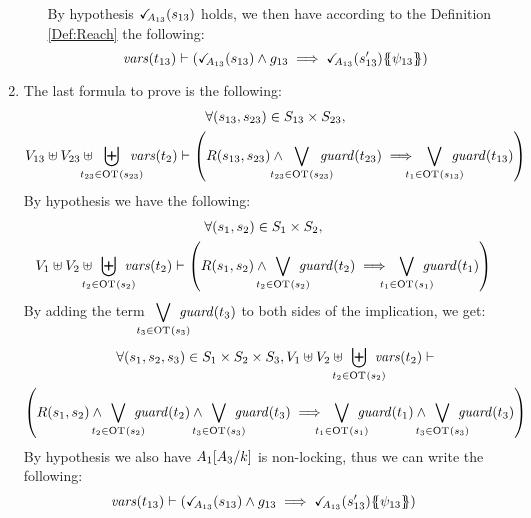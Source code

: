 \documentclass[runningheads]{llncs}
\begin{document}
\begin{enumerate}
\begin{itemize}
By hypothesis $\checkmark_{\!\! A_{13}}{\left(s_{13}\right)}$ holds,  we then have according to the Definition \ref{Def:Reach} the following:
\[ \fvars{t_{13}} \vdash \left(\reach{A_{13}}\mpar{s_{13}} \wedge g_{13} \implies \reach{A_{13}}\mpar{s_{13}'}\psubst{\psi_{13}}\right) \]	
\end{itemize}
\item The last formula to prove is the following:
\begin{multline*}
\forall \mpar{s_{13}, s_{23}} \in S_{13} \times S_{23},\\ V_{13} \uplus V_{23} \uplus \biguplus_\subbox{t_{23}\in \fOT{s_{23}}} \fvars{t_2} \vdash \left(R\mpar{s_{13}, s_{23}} \wedge \bigvee_\subbox{t_{23} \in \fOT{s_{23}}} \fguard{t_{23}} \implies \bigvee_\subbox{t_1 \in \fOT{s_{13}}} \fguard{t_{13}} \right)
\end{multline*}
By hypothesis we have the following:
\begin{multline*}
\forall \mpar{s_1, s_2} \in S_1 \times S_2,\\ V_1 \uplus V_2 \uplus \biguplus_\subbox{t_2 \in \fOT{s_2}} \fvars{t_2} \vdash \left(R\mpar{s_1, s_2} \wedge \bigvee_\subbox{t_2 \in \fOT{s_2}} \fguard{t_2} \implies \bigvee_\subbox{t_1 \in \fOT{s_1}} \fguard{t_1} \right)
\end{multline*}
By adding the term $\displaystyle{\bigvee_\subbox{t_3 \in \fOT{s_3}} \fguard{t_3}}$ to both sides of the implication, we get: 
\begin{multline*}
\forall \mpar{s_1, s_2,s_3} \in S_1 \times S_2 \times S_3, V_1 \uplus V_2 \uplus \biguplus_\subbox{t_2 \in \fOT{s_2}} \fvars{t_2} \vdash\\ \left(R\mpar{s_1, s_2} \wedge \bigvee_\subbox{t_2 \in \fOT{s_2}} \fguard{t_2} \wedge \bigvee_\subbox{t_3 \in \fOT{s_3}} \fguard{t_3} \implies \bigvee_\subbox{t_1 \in \fOT{s_1}} \fguard{t_1} \wedge \bigvee_\subbox{t_3 \in \fOT{s_3}} \fguard{t_3}\right)
\end{multline*}
By hypothesis we also have \(A_1{\left[A_3\middle/k\right]}\) is non-locking,  thus we can write the following:
\[ \fvars{t_{13}} \vdash \left(\reach{A_{13}}\mpar{s_{13}} \wedge g_{13} \implies \reach{A_{13}}\mpar{s_{13}'}\psubst{\psi_{13}}\right) \]	


\end{enumerate}




 
 
\end{document}
